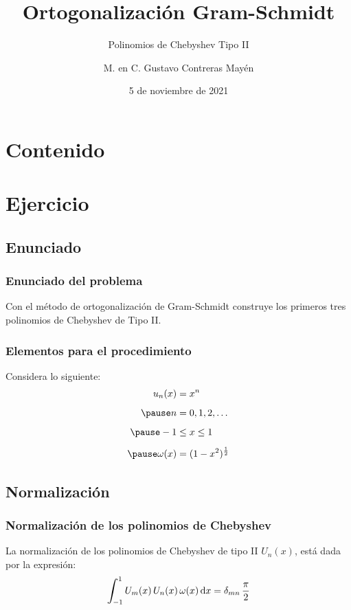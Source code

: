 \documentclass[12pt]{beamer}
\date{5 de noviembre de 2021}
\title{\large{Ortogonalización Gram-Schmidt}}
\subtitle{Polinomios de Chebyshev Tipo II}
\author{M. en C. Gustavo Contreras Mayén}
\begin{document}
\maketitle
\fontsize{14}{14}\selectfont
{}

\section*{Contenido}

\section{Ejercicio}
\subsection{Enunciado}

\begin{frame}
\frametitle{Enunciado del problema}
Con el método de ortogonalización de Gram-Schmidt construye los primeros tres polinomios de Chebyshev de Tipo II.
\end{frame}
\begin{frame}
\frametitle{Elementos para el procedimiento}
Considera lo siguiente:
\begin{eqnarray*}
\begin{aligned}
u_{n}(x) &= x^{n} \\[0.5em] \pause
n &= 0, 1, 2, \ldots \\[0.5em] \pause
-1 &\leq x \leq 1 \\[0.5em] \pause
\omega (x) &= (1 -x^{2})^{\frac{1}{2}}
\end{aligned}
\label{eq:}
\end{eqnarray*}
\end{frame}

\subsection{Normalización}

\begin{frame}
\frametitle{Normalización de los polinomios de Chebyshev}
La normalización de los polinomios de Chebyshev de tipo II $U_{n}(x)$, está dada por la expresión:
\pause
\begin{align*}
\scaleint{6ex}_{\bs -1}^{1} \, U_{m}(x) \, U_{n} (x) \, \omega (x) \dd{x} = \delta_{mn} \, \dfrac{\pi}{2}
\end{align*}
\end{frame}
\end{document}
